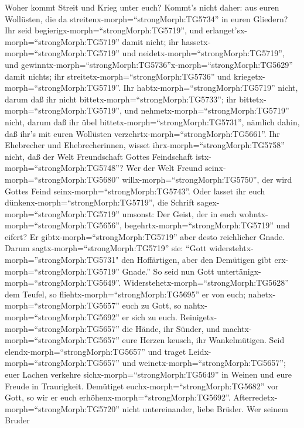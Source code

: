  Woher kommt Streit und Krieg unter euch? Kommt's nicht
daher: aus euren Wollüsten, die da
streitenx-morph=``strongMorph:TG5734'' in euren Gliedern? 
Ihr seid begierigx-morph=``strongMorph:TG5719'', und
erlanget'sx-morph=``strongMorph:TG5719'' damit nicht; ihr
hassetx-morph=``strongMorph:TG5719'' und
neidetx-morph=``strongMorph:TG5719'', und
gewinntx-morph=``strongMorph:TG5736''x-morph=``strongMorph:TG5629''
damit nichts; ihr streitetx-morph=``strongMorph:TG5736'' und
kriegetx-morph=``strongMorph:TG5719''. Ihr
habtx-morph=``strongMorph:TG5719'' nicht, darum daß ihr nicht
bittetx-morph=``strongMorph:TG5733'';  ihr
bittetx-morph=``strongMorph:TG5719'', und
nehmetx-morph=``strongMorph:TG5719'' nicht, darum daß ihr übel
bittetx-morph=``strongMorph:TG5731'', nämlich dahin, daß ihr's mit euren
Wollüsten verzehrtx-morph=``strongMorph:TG5661''.  Ihr
Ehebrecher und Ehebrecherinnen, wisset ihrx-morph=``strongMorph:TG5758''
nicht, daß der Welt Freundschaft Gottes Feindschaft
istx-morph=``strongMorph:TG5748''? Wer der Welt Freund
seinx-morph=``strongMorph:TG5680'' willx-morph=``strongMorph:TG5750'',
der wird Gottes Feind seinx-morph=``strongMorph:TG5743''. 
Oder lasset ihr euch dünkenx-morph=``strongMorph:TG5719'', die Schrift
sagex-morph=``strongMorph:TG5719'' umsonst: Der Geist, der in euch
wohntx-morph=``strongMorph:TG5656'',
begehrtx-morph=``strongMorph:TG5719'' und eifert?  Er
gibtx-morph=``strongMorph:TG5719'' aber desto reichlicher Gnade. Darum
sagtx-morph=``strongMorph:TG5719'' sie: ``Gott
widerstehtx-morph=''strongMorph:TG5731" den Hoffärtigen, aber den
Demütigen gibt erx-morph=``strongMorph:TG5719'' Gnade.''  So
seid nun Gott untertänigx-morph=``strongMorph:TG5649''.
Widerstehetx-morph=``strongMorph:TG5628'' dem Teufel, so
fliehtx-morph=``strongMorph:TG5695'' er von euch; 
nahetx-morph=``strongMorph:TG5657'' euch zu Gott, so
nahtx-morph=``strongMorph:TG5692'' er sich zu euch.
Reinigetx-morph=``strongMorph:TG5657'' die Hände, ihr Sünder, und
machtx-morph=``strongMorph:TG5657'' eure Herzen keusch, ihr
Wankelmütigen.  Seid elendx-morph=``strongMorph:TG5657'' und
traget Leidx-morph=``strongMorph:TG5657'' und
weinetx-morph=``strongMorph:TG5657''; euer Lachen verkehre
sichx-morph=``strongMorph:TG5649'' in Weinen und eure Freude in
Traurigkeit.  Demütiget euchx-morph=``strongMorph:TG5682''
vor Gott, so wir er euch erhöhenx-morph=``strongMorph:TG5692''.
 Afterredetx-morph=``strongMorph:TG5720'' nicht
untereinander, liebe Brüder. Wer seinem Bruder
